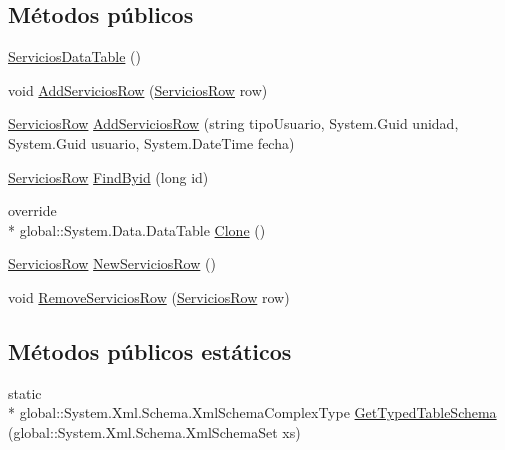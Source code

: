 \subsection*{Métodos públicos}
\begin{DoxyCompactItemize}
\item 
\hyperlink{class_proyecto___integrador__3_1_1ds_servicios_1_1_servicios_data_table_af447c5ce011f17746ed48380ef8f5373}{Servicios\-Data\-Table} ()
\item 
void \hyperlink{class_proyecto___integrador__3_1_1ds_servicios_1_1_servicios_data_table_a7974644d9b5b0b8a5984af24e16700bb}{Add\-Servicios\-Row} (\hyperlink{class_proyecto___integrador__3_1_1ds_servicios_1_1_servicios_row}{Servicios\-Row} row)
\item 
\hyperlink{class_proyecto___integrador__3_1_1ds_servicios_1_1_servicios_row}{Servicios\-Row} \hyperlink{class_proyecto___integrador__3_1_1ds_servicios_1_1_servicios_data_table_ad1be2ae4d234bb0b02c800b641a588d3}{Add\-Servicios\-Row} (string tipo\-Usuario, System.\-Guid unidad, System.\-Guid usuario, System.\-Date\-Time fecha)
\item 
\hyperlink{class_proyecto___integrador__3_1_1ds_servicios_1_1_servicios_row}{Servicios\-Row} \hyperlink{class_proyecto___integrador__3_1_1ds_servicios_1_1_servicios_data_table_a3b9b5f243557e8678068d79c90098010}{Find\-Byid} (long id)
\item 
override \\*
global\-::\-System.\-Data.\-Data\-Table \hyperlink{class_proyecto___integrador__3_1_1ds_servicios_1_1_servicios_data_table_a18c623c7de1cbb4a820376247c4cc80c}{Clone} ()
\item 
\hyperlink{class_proyecto___integrador__3_1_1ds_servicios_1_1_servicios_row}{Servicios\-Row} \hyperlink{class_proyecto___integrador__3_1_1ds_servicios_1_1_servicios_data_table_acf349fca06c159ff3684420872cd39ef}{New\-Servicios\-Row} ()
\item 
void \hyperlink{class_proyecto___integrador__3_1_1ds_servicios_1_1_servicios_data_table_af3be40086cae340eb21f7bb459fc2fe7}{Remove\-Servicios\-Row} (\hyperlink{class_proyecto___integrador__3_1_1ds_servicios_1_1_servicios_row}{Servicios\-Row} row)
\end{DoxyCompactItemize}
\subsection*{Métodos públicos estáticos}
\begin{DoxyCompactItemize}
\item 
static \\*
global\-::\-System.\-Xml.\-Schema.\-Xml\-Schema\-Complex\-Type \hyperlink{class_proyecto___integrador__3_1_1ds_servicios_1_1_servicios_data_table_a98f4a20812c3720bf15930302ee8a47a}{Get\-Typed\-Table\-Schema} (global\-::\-System.\-Xml.\-Schema.\-Xml\-Schema\-Set xs)
\end{DoxyCompactItemize}
